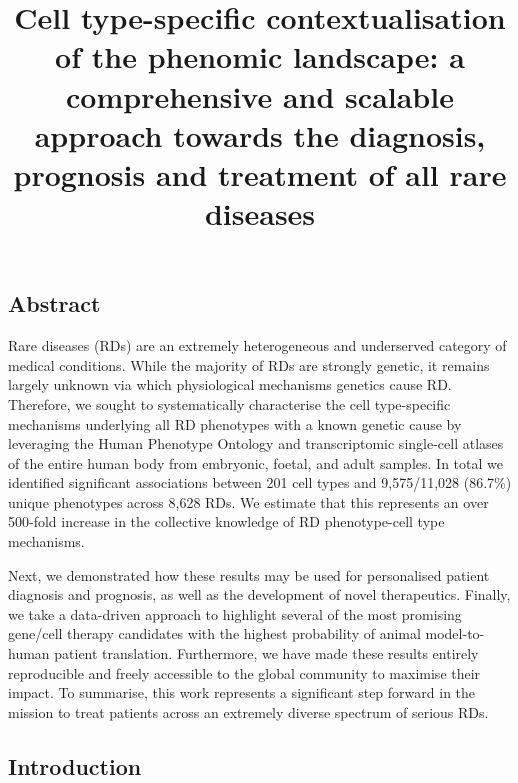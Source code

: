 \documentclass[
sn-nature
]{sn-jnl}
\title[Cell type-specific contextualisation of the phenomic landscape: a
comprehensive and scalable approach towards the diagnosis, prognosis and
treatment of all rare diseases]{Cell type-specific contextualisation of
the phenomic landscape: a comprehensive and scalable approach towards
the diagnosis, prognosis and treatment of all rare diseases}
\author*[aff-1]{\fnm{Brian M.} \sur{Schilder}}\email{brian\_schilder@alumni.brown.edu}\author[aff-1]{\fnm{Kitty B.} \sur{Murphy}}\author[aff-1]{\fnm{Robert} \sur{Gordon-Smith}}\author[aff-1]{\fnm{Jai} \sur{Chapman}}\author[aff-1]{\fnm{Momoko} \sur{Otani}}\author*[aff-1]{\fnm{Nathan G.} \sur{Skene}}\email{n.skene@imperial.ac.uk}
\affil[aff-1]{, \orgname{Imperial College London}}
\begin{document}
\maketitle

\subsection{Abstract}\label{abstract}

Rare diseases (RDs) are an extremely heterogeneous and underserved
category of medical conditions. While the majority of RDs are strongly
genetic, it remains largely unknown via which physiological mechanisms
genetics cause RD. Therefore, we sought to systematically characterise
the cell type-specific mechanisms underlying all RD phenotypes with a
known genetic cause by leveraging the Human Phenotype Ontology and
transcriptomic single-cell atlases of the entire human body from
embryonic, foetal, and adult samples. In total we identified significant
associations between 201 cell types and 9,575/11,028 (86.7\%) unique
phenotypes across 8,628 RDs. We estimate that this represents an over
500-fold increase in the collective knowledge of RD phenotype-cell type
mechanisms.

Next, we demonstrated how these results may be used for personalised
patient diagnosis and prognosis, as well as the development of novel
therapeutics. Finally, we take a data-driven approach to highlight
several of the most promising gene/cell therapy candidates with the
highest probability of animal model-to-human patient translation.
Furthermore, we have made these results entirely reproducible and freely
accessible to the global community to maximise their impact. To
summarise, this work represents a significant step forward in the
mission to treat patients across an extremely diverse spectrum of
serious RDs.

\subsection{Introduction}\label{sec-introduction}
\end{document}
